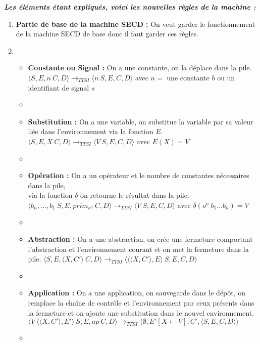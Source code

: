 \documentclass[10pt,a4paper]{report}
\begin{document}
	\textbf{\textit{Les éléments étant expliqués, voici les nouvelles règles de la machine :}}
	\smallbreak
	\begin{enumerate}
		\item[] \textbf{Partie de base de la machine SECD :} On veut garder le fonctionnement de la machine SECD de base donc il faut garder ces règles.	
		\item[]
		\begin{itemize}
			\item[] \textbf{Constante ou Signal :} On a une constante, on la déplace dans la pile.
			\smallbreak
			$\langle S,E,n~C,D\rangle 
			\longrightarrow_{TTSI} 
			\langle n~S,E,C,D\rangle$ avec $n =$ une constante $b$ ou un identifiant de signal $s$
			\item[]
			
			\item[] \textbf{Substitution :} On a une variable, on substitue la variable par sa valeur liée dans l'environnement via la fonction $E$.
			\smallbreak
			$\langle S,E,X~C,D\rangle
			\longrightarrow_{TTSI} 
			\langle V~S,E,C,D\rangle$ avec $E(X) = V$
			\item[]
			
			\item[] \textbf{Opération :} On a un opérateur et le nombre de constantes nécessaires dans la pile, \\via la fonction $\delta$ on retourne le résultat dans la pile.
			\smallbreak
			$\langle b_{n},...,b_{1}~S,E,prim_{o^{n}}~C,D\rangle
			\longrightarrow_{TTSI} 
			\langle V~S,E,C,D\rangle$ avec $\delta(o^{n}~b_{1}...b_{n}) = V$
			\item[]
			
			\item[]  \textbf{Abstraction :} On a une abstraction, on crée une fermeture comportant l'abstraction et l'environnement courant et on met la fermeture dans la pile.
			\smallbreak
			$\langle S,E,\langle X,C'\rangle~C,D\rangle
			\longrightarrow_{TTSI} 
			\langle \langle\langle X,C'\rangle,E\rangle~S,E,C,D\rangle$
			\item[]
			
			\item[]  \textbf{Application :} On a une application, on sauvegarde dans le dépôt, on remplace la chaîne de contrôle et l'environnement par ceux présents dans la fermeture et on ajoute une substitution  dans le nouvel environnement.
			\smallbreak
			$\langle V~\langle\langle X,C'\rangle,E'\rangle~S,E,ap~C,D\rangle
			\longrightarrow_{TTSI} 
			\langle \emptyset,E'[X \leftarrow V],C',\langle S,E,C,D\rangle\rangle$
			\item[] 
			

\end{itemize}
\end{enumerate}
\end{document}
